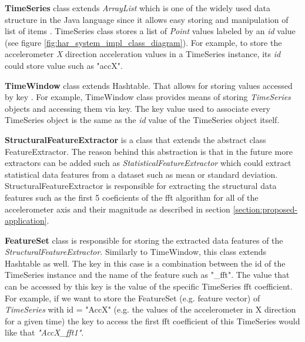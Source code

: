     \textbf{TimeSeries} class extends \textit{ArrayList} which is one of the widely used data structure in the Java language since it allows easy storing and manipulation of list of items \citep{oraclearrayList_2017}. TimeSeries class stores a list of \textit{Point} values labeled by an \textit{id} value (see figure \ref{fig:har_system_impl_class_diagram}). For example, to store the accelerometer \textit{X} direction acceleration values in a TimeSeries instance, its \textit{id} could store value such as "accX".
        
    \textbf{TimeWindow} class extends Hashtable. That allows for storing values accessed by key \citep{oraclehashtable_2017}. For example, TimeWindow class provides means of storing \textit{TimeSeries} objects and accessing them via key. The key value used to associate every TimeSeries object is the same as the \textit{id} value of the TimeSeries object itself.
    
    \textbf{StructuralFeatureExtractor} is a class that extends the abstract class FeatureExtractor. The reason behind this abstraction is that in the future more extractors can be added such as \textit{StatisticalFeatureExtractor} which could extract statistical data features from a dataset such as mean or standard deviation. StructuralFeatureExtractor is responsible for extracting the structural data features such as the first 5 coeficients of the \gls{fft} algorithm for all of the accelerometer axis and their magnitude as described in section \ref{section:proposed-application}.
    
    \textbf{FeatureSet} class is responsible for storing the extracted data features of the \textit{StructuralFeatureExtractor}. Similarly to TimeWindow, this class extends Hashtable as well. The key in this case is a combination between the id of the TimeSeries instance and the name of the feature such as "\_fft". The value that can be accessed by this key is the value of the specific TimeSeries \gls{fft} coefficient. For example, if we want to store the FeatureSet (e.g. feature vector) of \textit{TimeSeries} with id = "AccX" (e.g. the values of the accelerometer in X direction for a given time) the key to access the first \gls{fft} coefficient of this TimeSeries would like that \textit{"AccX\_fft1"}.
    
